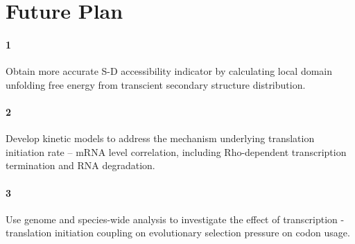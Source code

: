 \documentclass[11pt, a4paper]{article}
\begin{document}
\section{Future Plan}
\paragraph{1} Obtain more accurate S-D accessibility indicator by calculating local domain unfolding free energy from transcient secondary structure distribution.
\paragraph{2} Develop kinetic models to address the mechanism underlying translation initiation rate – mRNA level correlation, including Rho-dependent transcription termination and RNA degradation.
\paragraph{3} Use genome and species-wide analysis to investigate the effect of transcription - translation initiation coupling on evolutionary selection pressure on codon usage.

\small


\end{document}
